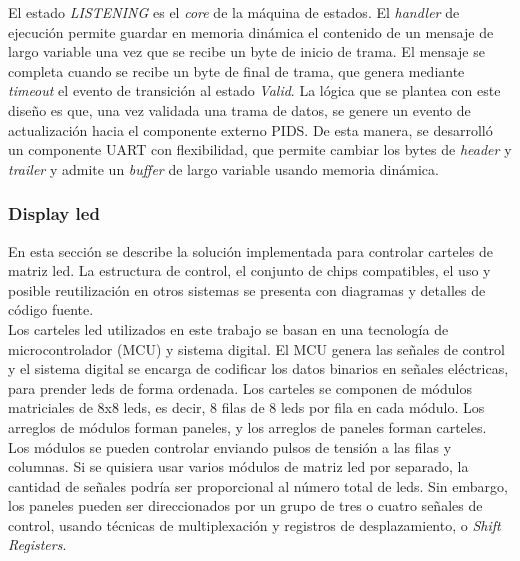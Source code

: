 El estado \textit{LISTENING} es el \textit{core} de la máquina de estados. El \textit{handler} de ejecución permite guardar en memoria dinámica el contenido de un mensaje de largo variable una vez que se recibe un byte de inicio de trama.  El mensaje se completa cuando se recibe un byte de final de trama, que genera mediante \textit{timeout} el evento de transición al estado \textit{Valid}. La lógica que se plantea con este diseño es que, una vez validada una trama de datos, se genere un evento de actualización hacia el componente externo PIDS. De esta manera, se desarrolló un componente UART con flexibilidad, que permite cambiar los bytes de \textit{header} y \textit{trailer} y admite un \textit{buffer} de largo variable usando memoria dinámica. \\

\subsubsection{Display led}

En esta sección se describe la solución implementada para controlar carteles de matriz led. La estructura de control, el conjunto de chips compatibles, el uso y posible reutilización en otros sistemas se presenta con diagramas y detalles de código fuente. \\

Los carteles led utilizados en este trabajo se basan en una tecnología de microcontrolador (MCU) y sistema digital. El MCU genera las señales de control y el sistema digital se encarga de codificar los datos binarios en señales eléctricas, para prender leds de forma ordenada. Los carteles se componen de módulos matriciales de 8x8 leds, es decir, 8 filas de 8 leds por fila en cada módulo. Los arreglos de módulos forman paneles, y los arreglos de paneles forman carteles. Los módulos se pueden controlar enviando pulsos de tensión a las filas y columnas. Si se quisiera usar varios módulos de matriz led por separado, la cantidad de señales podría ser proporcional al número total de leds. Sin embargo, los paneles pueden ser direccionados por un grupo de tres o cuatro señales de control, usando técnicas de multiplexación y registros de desplazamiento, o \textit{Shift Registers}. \\


